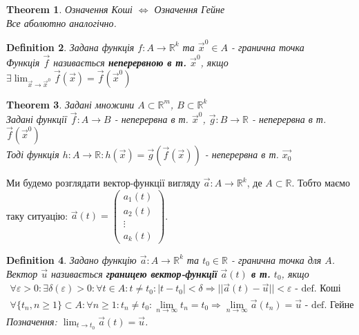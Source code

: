 \documentclass[a4paper, 10pt]{article}
\def\huge{\displaystyle}
\theoremstyle{theoremdd}
\newtheorem{theorem}{Theorem}[subsection]
\theoremstyle{theoremdd}
\newtheorem{definition}[theorem]{Definition}
\theoremstyle{theoremdd}
\theoremstyle{theoremdd}
\theoremstyle{theoremdd}
\theoremstyle{theoremdd}
\theoremstyle{theoremdd}
\theoremstyle{theoremdd}
\begin{document}
\begin{theorem}
Означення Коші $\iff$ Означення Гейне\\
\textit{Все аболютно аналогічно.}
\end{theorem}

\begin{definition}
Задана функція $f: A \to \mathbb{R}^k$ та $\vec{x}^0 \in A$ - гранична точка\\
Функція $\vec{f}$ називається \textbf{неперервною в т.} $\vec{x}^0$, якщо $\exists \huge \lim_{\vec{x} \to \vec{x}^0} \vec{f}(\vec{x}) = \vec{f}(\vec{x}^0)$
\end{definition}

\begin{theorem}
Задані множини $A \subset \mathbb{R}^m$, $B \subset \mathbb{R}^k$\\
Задані функції $\vec{f}: A \to B$ - неперервна в т. $\vec{x}^0$, $\vec{g}: B \to \mathbb{R}$ - неперервна в т. $\vec{f}(\vec{x}^0)$\\
Тоді функція $h: A \to \mathbb{R}: h(\vec{x}) = \vec{g}(\vec{f}(\vec{x}))$ - неперервна в т. $\vec{x_0}$
\end{theorem}
\fi
Ми будемо розглядати вектор-функції вигляду $\vec{a}: A \to \mathbb{R}^k$, де $A \subset \mathbb{R}$. Тобто маємо таку ситуацію: $\vec{a}(t) = \begin{pmatrix}
a_1(t) \\ a_2(t) \\ \vdots \\ a_k(t)
\end{pmatrix}$.

\begin{definition}
Задано функцію $\vec{a}: A \to \mathbb{R}^k$ та $t_0 \in \mathbb{R}$ - гранична точка для $A$.\\
Вектор $\vec{u}$ називається \textbf{границею вектор-функції} $\vec{a}(t)$ \textbf{в т.} $t_0$, якщо
\begin{align*}
\forall \varepsilon > 0: \exists \delta(\varepsilon) > 0: \forall t \in A: t \neq t_0: |t-t_0| < \delta \Rightarrow ||\vec{a}(t) - \vec{u}|| < \varepsilon \textrm{ - def. Коші}\\
\forall \{t_n, n \geq 1\} \subset A: \forall n \geq 1: t_n \neq t_0: \huge \lim_{n \to \infty} t_n = t_0 \Rightarrow \lim_{n \to \infty} \vec{a}(t_n) = \vec{u} \textrm{ - def. Гейне}
\end{align*}
Позначення: $\huge \lim_{t \to t_0} \vec{a}(t) = \vec{u}$.
\end{definition}
\end{document}
